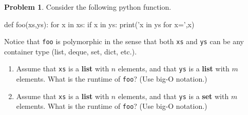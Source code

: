 \documentclass[12pt]{article}
\theoremstyle{definition}
\newtheorem{problem}{Problem}
\begin{document}
{\begin{problem}
Consider the following python function.
\begin{python}
def foo(xs,ys):
    for x in xs:
        if x in ys:
            print('x in ys for x=',x)
\end{python}
Notice that \texttt{foo} is polymorphic in the sense that both \texttt{xs} and \texttt{ys} can be any container type (list, deque, set, dict, etc.).
\begin{enumerate}
    \item 
        Assume that \texttt{xs} is a \textbf{list} with $n$ elements,
        and that \texttt{ys} is a \textbf{list} with $m$ elements.
        What is the runtime of \texttt{foo}?
        (Use big-O notation.)
        \vspace{1in}
    \item
        Assume that \texttt{xs} is a \textbf{list} with $n$ elements,
        and that \texttt{ys} is a \textbf{set} with $m$ elements.
        What is the runtime of \texttt{foo}?
        (Use big-O notation.)
        \vspace{1in}
\end{enumerate}
\end{problem}
}
\end{document}

